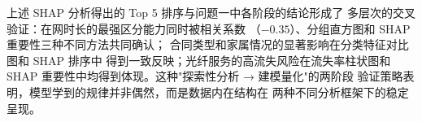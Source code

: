 上述 SHAP 分析得出的 Top 5 排序与问题一中各阶段的结论形成了
多层次的交叉验证：在网时长的最强区分能力同时被相关系数
（$-0.35$）、分组直方图和 SHAP 重要性三种不同方法共同确认；
合同类型和家属情况的显著影响在分类特征对比图和 SHAP 排序中
得到一致反映；光纤服务的高流失风险在流失率柱状图和 SHAP
重要性中均得到体现。这种"探索性分析 → 建模量化"的两阶段
验证策略表明，模型学到的规律并非偶然，而是数据内在结构在
两种不同分析框架下的稳定呈现。

